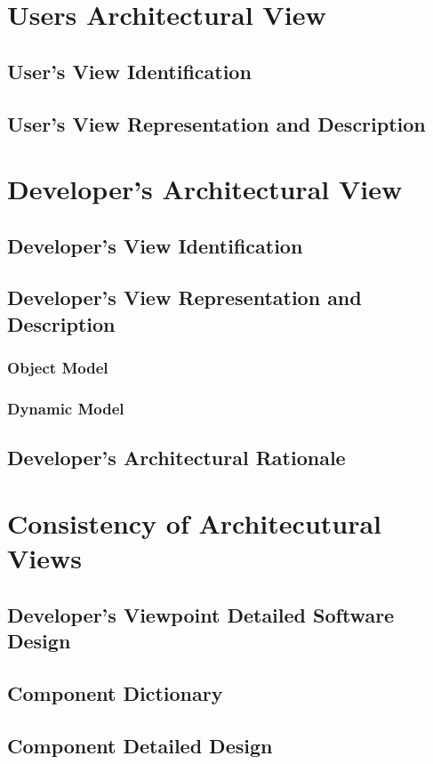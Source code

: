 	\section{Users Architectural View}
		\subsection{User's View Identification}
		\subsection{User's View Representation and Description}
	\section{Developer's Architectural View}
		 \subsection{Developer's View Identification}
		 \subsection{Developer's View Representation and Description}
			\subsubsection{Object Model}
			\subsubsection{Dynamic Model}
		 \subsection{Developer's Architectural Rationale}
	\section{Consistency of Architecutural Views}
		\subsection{Developer's Viewpoint Detailed Software Design}
		\subsection{Component Dictionary}
		\subsection{Component Detailed Design}
